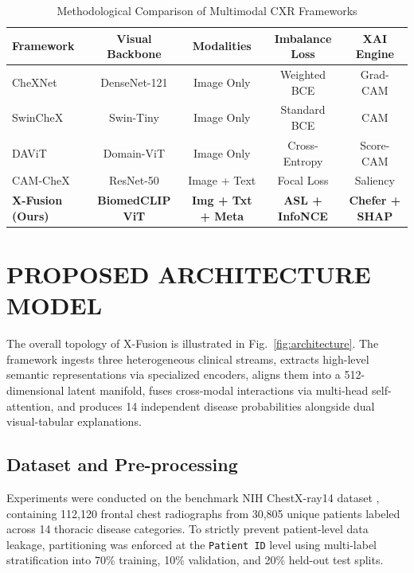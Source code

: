 \documentclass[conference]{IEEEtran}
\begin{document}
\begin{table}[t]
\caption{Methodological Comparison of Multimodal CXR Frameworks}
\label{tab:literature_comparison}
\centering
\scriptsize
\setlength{\tabcolsep}{2.5pt}
\begin{tabular}{lcccc}
\toprule
\textbf{Framework} & \textbf{Visual Backbone} & \textbf{Modalities} & \textbf{Imbalance Loss} & \textbf{XAI Engine} \\
\midrule
CheXNet \cite{rajpurkar2017chexnet} & DenseNet-121 & Image Only & Weighted BCE & Grad-CAM \\
SwinCheX \cite{taslimi2022swinchex} & Swin-Tiny & Image Only & Standard BCE & CAM \\
DAViT \cite{fu2025davit} & Domain-ViT & Image Only & Cross-Entropy & Score-CAM \\
CAM-CheX \cite{sloan2026camchex} & ResNet-50 & Image + Text & Focal Loss & Saliency \\
\textbf{X-Fusion (Ours)} & \textbf{BiomedCLIP ViT} & \textbf{Img + Txt + Meta} & \textbf{ASL + InfoNCE} & \textbf{Chefer + SHAP} \\
\bottomrule
\end{tabular}
\end{table}

\section{PROPOSED ARCHITECTURE MODEL}
The overall topology of X-Fusion is illustrated in Fig.~\ref{fig:architecture}. The framework ingests three heterogeneous clinical streams, extracts high-level semantic representations via specialized encoders, aligns them into a 512-dimensional latent manifold, fuses cross-modal interactions via multi-head self-attention, and produces 14 independent disease probabilities alongside dual visual-tabular explanations.

\subsection{Dataset and Pre-processing}
Experiments were conducted on the benchmark NIH ChestX-ray14 dataset \cite{wang2017chestxray8}, containing 112,120 frontal chest radiographs from 30,805 unique patients labeled across 14 thoracic disease categories. To strictly prevent patient-level data leakage, partitioning was enforced at the \texttt{Patient ID} level using multi-label stratification into 70\% training, 10\% validation, and 20\% held-out test splits.
\end{document}
